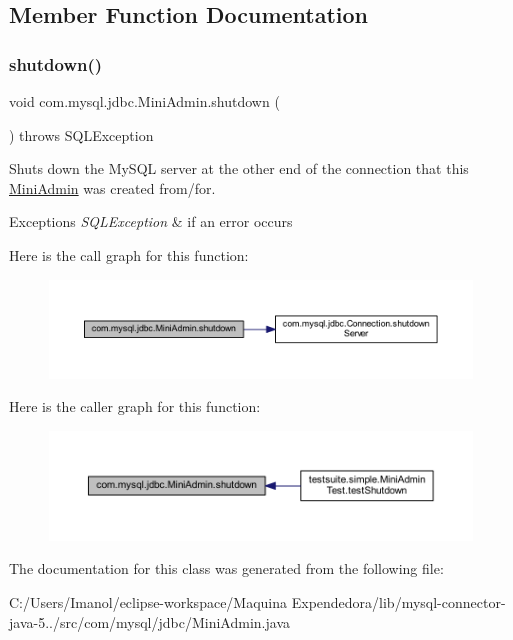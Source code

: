 \subsection{Member Function Documentation}
\mbox{\label{classcom_1_1mysql_1_1jdbc_1_1_mini_admin_a2d976dc99e2fd7ea82cf744a6156d4d6}} 
\subsubsection{\texorpdfstring{shutdown()}{shutdown()}}
{\footnotesize\ttfamily void com.\+mysql.\+jdbc.\+Mini\+Admin.\+shutdown (\begin{DoxyParamCaption}{ }\end{DoxyParamCaption}) throws S\+Q\+L\+Exception}

Shuts down the My\+S\+QL server at the other end of the connection that this \mbox{\hyperlink{classcom_1_1mysql_1_1jdbc_1_1_mini_admin}{Mini\+Admin}} was created from/for.


\begin{DoxyExceptions}{Exceptions}
{\em S\+Q\+L\+Exception} & if an error occurs \\
\hline
\end{DoxyExceptions}
Here is the call graph for this function\+:
\nopagebreak
\begin{figure}[H]
\begin{center}
\leavevmode
\includegraphics[width=350pt]{classcom_1_1mysql_1_1jdbc_1_1_mini_admin_a2d976dc99e2fd7ea82cf744a6156d4d6_cgraph}
\end{center}
\end{figure}
Here is the caller graph for this function\+:
\nopagebreak
\begin{figure}[H]
\begin{center}
\leavevmode
\includegraphics[width=350pt]{classcom_1_1mysql_1_1jdbc_1_1_mini_admin_a2d976dc99e2fd7ea82cf744a6156d4d6_icgraph}
\end{center}
\end{figure}


The documentation for this class was generated from the following file\+:\begin{DoxyCompactItemize}
\item 
C\+:/\+Users/\+Imanol/eclipse-\/workspace/\+Maquina Expendedora/lib/mysql-\/connector-\/java-\/5../src/com/mysql/jdbc/Mini\+Admin.\+java\end{DoxyCompactItemize}
